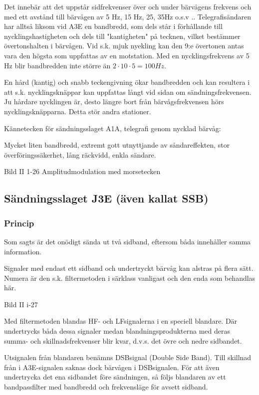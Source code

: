 Det innebär att det uppstår sidfrekvenser över och under bärvågens frekvens och med
ett avstånd till bärvågen av 5 Hz, 15 Hz, 25, 35Hz o.s.v .. Telegrafisändaren har alltså
liksom vid A3E en bandbredd, som dels står i förhållande till nycklingshastigheten och
dels till "kantigheten" på tecknen, vilket bestämmer övertonshalten i bärvågen. Vid s.k.
mjuk nyekling kan den 9:e övertonen antas vara den högsta som uppfattas av en motstation.
Med en nycklingsfrekvens av 5 Hz blir bandbredden inte större än
$2 \cdot 10 \cdot 5 = 100Hz$.

En hård (kantig) och snabb teckengivning ökar bandbredden och kan resultera i att s.k.
nycklingsknäppar kan uppfattas långt vid sidan om sändningsfrekvensen. Ju hårdare
nycklingen är, desto längre bort från bärvågsfrekvensen hörs nycklingsknäpparna. Detta
stör andra stationer.

Kännetecken för sändningsslaget A1A, telegrafi genom nycklad bärvåg:

Mycket liten bandbredd, extremt gott utnyttjande av såndareffekten, stor
överföringssäkerhet, lång räckvidd, enkla sändare.

Bild II 1-26 Amplitudmodulation med morsetecken

\subsection{Sändningsslaget J3E (även kallat SSB)}

\subsubsection{Princip}

Som sagts är det onödigt sända ut två sidband, eftersom båda innehåller samma information.

Signaler med endast ett sidband och undertryckt bärvåg kan alstras på flera sätt.
Numera är den s.k. filtermetoden i särklass vanligast och den enda som behandlas här.

Bild II i-27

Med filtermetoden blandas HF- och LFsignalerna i en speciell blandare. Där undertrycks
båda dessa signaler medan blandningsprodukterna med deras summa- och skillnadsfrekvenser
blir kvar, d.v.s. det övre och nedre sidbandet.

Utsignalen från blandaren benämns DSBsignal (Double Side Band). Till skillnad från
i A3E-signalen saknas dock bärvågen i DSBsignalen. För att även undertrycka det ena
sidbandet före sändningen, så följs blandaren av ett bandpassfilter med bandbredd
och frekvensläge för avsett sidband.

